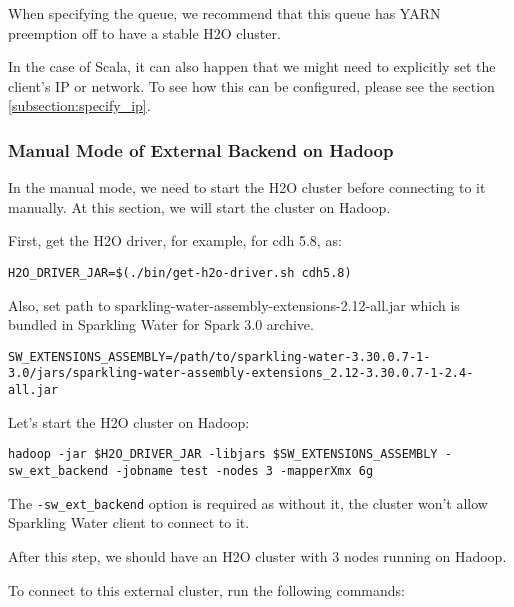 When specifying the queue, we recommend that this queue has YARN preemption off to have a stable H2O cluster.

In the case of Scala, it can also happen that we might need to explicitly set the client's IP or network. To see how this
can be configured, please see the section \ref{subsection:specify_ip}.

\subsubsection{Manual Mode of External Backend on Hadoop}

In the manual mode, we need to start the H2O cluster before connecting to it manually. At this section, we
will start the cluster on Hadoop.

First, get the H2O driver, for example, for cdh 5.8, as:

\begin{lstlisting}[style=bash]
H2O_DRIVER_JAR=$(./bin/get-h2o-driver.sh cdh5.8)
\end{lstlisting}

Also, set path to sparkling-water-assembly-extensions-2.12-all.jar which is bundled in Sparkling Water for Spark 3.0 archive.

\begin{lstlisting}[style=bash]
SW_EXTENSIONS_ASSEMBLY=/path/to/sparkling-water-3.30.0.7-1-3.0/jars/sparkling-water-assembly-extensions_2.12-3.30.0.7-1-2.4-all.jar
\end{lstlisting}

Let's start the H2O cluster on Hadoop:

\begin{lstlisting}[style=bash]
hadoop -jar $H2O_DRIVER_JAR -libjars $SW_EXTENSIONS_ASSEMBLY -sw_ext_backend -jobname test -nodes 3 -mapperXmx 6g
\end{lstlisting}

The \texttt{-sw\_ext\_backend} option is required as without it, the cluster won't allow Sparkling Water client to connect to it.

After this step, we should have an H2O cluster with 3 nodes running on Hadoop.

To connect to this external cluster, run the following commands:

